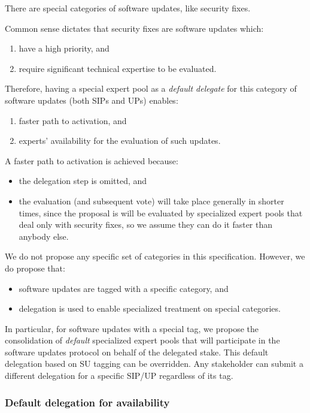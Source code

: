 \documentclass[11pt,a4paper]{article}
\begin{document}
There are special categories of software updates, like security fixes.

Common sense dictates that security fixes are software updates which:
\begin{enumerate}
\item have a high priority, and
\item require significant technical expertise to be evaluated.
\end{enumerate}
Therefore, having a special expert pool as a \emph{default delegate} for this
category of software updates (both SIPs and UPs) enables:
\begin{enumerate}
\item faster path to activation, and
\item experts' availability for the evaluation of such updates.
\end{enumerate}
A faster path to activation is achieved because:
\begin{itemize}
\item the delegation step is omitted, and
\item the evaluation (and subsequent vote) will take place generally in shorter
  times, since the proposal is will be evaluated by specialized expert pools that
  deal only with security fixes, so we assume they can do it faster than anybody
  else.
\end{itemize}

We do not propose any specific set of categories in this specification. However,
we do propose that:
\begin{itemize}
\item software updates are tagged with a specific category, and
\item delegation is used to enable specialized treatment on special categories.
\end{itemize}
In particular, for software updates with a special tag, we propose the
consolidation of \emph{default} specialized expert pools that will participate
in the software updates protocol on behalf of the delegated stake.
%
This default delegation based on SU tagging can be overridden. Any stakeholder
can submit a different delegation for a specific SIP/UP regardless of its tag.

\subsubsection{Default delegation for availability}
\label{sec:defa-deleg-avail}
\end{document}
